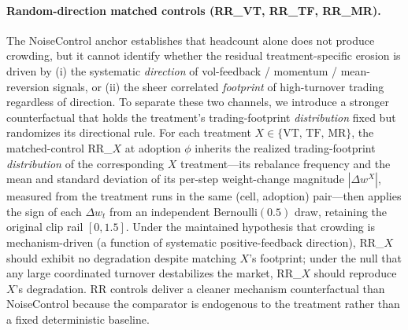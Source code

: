 \documentclass[12pt,a4paper]{article}
\begin{document}
\paragraph{Random-direction matched controls (RR\_VT, RR\_TF, RR\_MR).} The NoiseControl anchor establishes that headcount alone does not produce crowding, but it cannot identify whether the residual treatment-specific erosion is driven by (i) the systematic \emph{direction} of vol-feedback / momentum / mean-reversion signals, or (ii) the sheer correlated \emph{footprint} of high-turnover trading regardless of direction. To separate these two channels, we introduce a stronger counterfactual that holds the treatment's trading-footprint \emph{distribution} fixed but randomizes its directional rule. For each treatment $X \in \{\text{VT, TF, MR}\}$, the matched-control RR\_$X$ at adoption $\phi$ inherits the realized trading-footprint \emph{distribution} of the corresponding $X$ treatment---its rebalance frequency and the mean and standard deviation of its per-step weight-change magnitude $|\Delta w^X|$, measured from the treatment runs in the same (cell, adoption) pair---then applies the sign of each $\Delta w_t$ from an independent Bernoulli$(0.5)$ draw, retaining the original clip rail $[0, 1.5]$. Under the maintained hypothesis that crowding is mechanism-driven (a function of systematic positive-feedback direction), RR\_$X$ should exhibit no degradation despite matching $X$'s footprint; under the null that any large coordinated turnover destabilizes the market, RR\_$X$ should reproduce $X$'s degradation. RR controls deliver a cleaner mechanism counterfactual than NoiseControl because the comparator is endogenous to the treatment rather than a fixed deterministic baseline.
\end{document}
